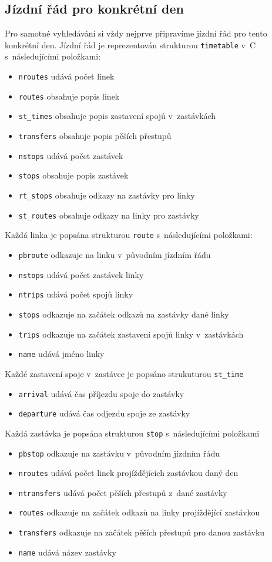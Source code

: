 \subsection{Jízdní řád pro konkrétní den}
Pro samotné vyhledávání si vždy nejprve připravíme jízdní řád pro tento
konkrétní den. Jízdní řád je reprezentován strukturou {\tt timetable} v~C s~následujícími
položkami:
\begin{itemize}
	\item {\tt nroutes} udává počet linek
	\item {\tt routes} obsahuje popis linek
	\item {\tt st\_times} obsahuje popis zastavení spojů v~zastávkách
	\item {\tt transfers} obsahuje popis pěších přestupů
	\item {\tt nstops} udává počet zastávek
	\item {\tt stops} obsahuje popis zastávek
	\item {\tt rt\_stops} obsahuje odkazy na zastávky pro linky 
	\item {\tt st\_routes} obsahuje odkazy na linky pro zastávky
\end{itemize}
Každá linka je popsána strukturou {\tt route} s~následujícími položkami:
\begin{itemize}
	\item {\tt pbroute} odkazuje na linku v~původním jízdním řádu
	\item {\tt nstops} udává počet zastávek linky
	\item {\tt ntrips} udává počet spojů linky
	\item {\tt stops} odkazuje na začátek odkazů na zastávky dané linky
	\item {\tt trips} odkazuje na začátek zastavení spojů linky v~zastávkách 
	\item {\tt name} udává jméno linky
\end{itemize}
Každé zastavení spoje v~zastávce je popsáno strukuturou {\tt st\_time}
\begin{itemize}
	\item {\tt arrival} udává čas příjezdu spoje do zastávky
	\item {\tt departure} udává čas odjezdu spoje ze zastávky
\end{itemize}
Každá zastávka je popsána strukturou {\tt stop} s~následujícími položkami
\begin{itemize}
	\item {\tt pbstop} odkazuje na zastávku v~původním jízdním řádu
	\item {\tt nroutes} udává počet linek projíždějících zastávkou daný den
	\item {\tt ntransfers} udává počet pěších přestupů z~dané zastávky
	\item {\tt routes} odkazuje na začátek odkazů na linky projíždějící
	zastávkou 
	\item {\tt transfers} odkazuje na začátek pěších přestupů pro danou
	zastávku
	\item {\tt name} udává název zastávky
\end{itemize}

